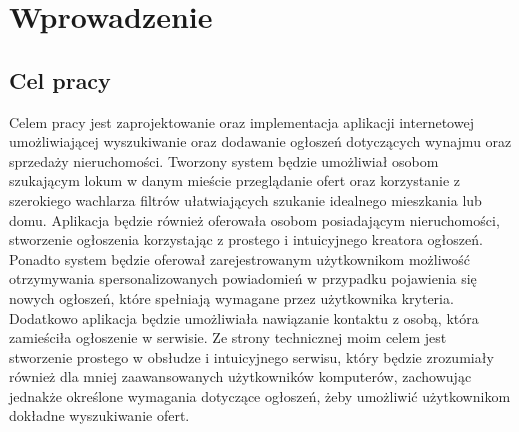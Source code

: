 \chapter{Wprowadzenie}
\label{cha:wprowadzenie}


\section{Cel pracy}
\label{sec:celPracy}
Celem pracy jest zaprojektowanie oraz implementacja aplikacji internetowej umożliwiającej wyszukiwanie oraz dodawanie ogłoszeń dotyczących wynajmu oraz sprzedaży nieruchomości. Tworzony system będzie umożliwiał osobom szukającym lokum w danym mieście przeglądanie ofert oraz korzystanie z szerokiego wachlarza filtrów ułatwiających szukanie idealnego mieszkania lub domu. Aplikacja będzie również oferowała osobom posiadającym nieruchomości, stworzenie ogłoszenia korzystając z prostego i intuicyjnego kreatora ogłoszeń. Ponadto system będzie oferował zarejestrowanym użytkownikom możliwość otrzymywania  spersonalizowanych powiadomień w przypadku pojawienia się nowych ogłoszeń, które spełniają wymagane przez użytkownika kryteria. Dodatkowo aplikacja będzie umożliwiała nawiązanie kontaktu z osobą, która zamieściła ogłoszenie w serwisie. Ze strony technicznej moim celem jest stworzenie prostego w obsłudze i intuicyjnego serwisu, który będzie zrozumiały również dla mniej zaawansowanych użytkowników komputerów, zachowując jednakże określone wymagania dotyczące ogłoszeń, żeby umożliwić użytkownikom dokładne wyszukiwanie ofert.


